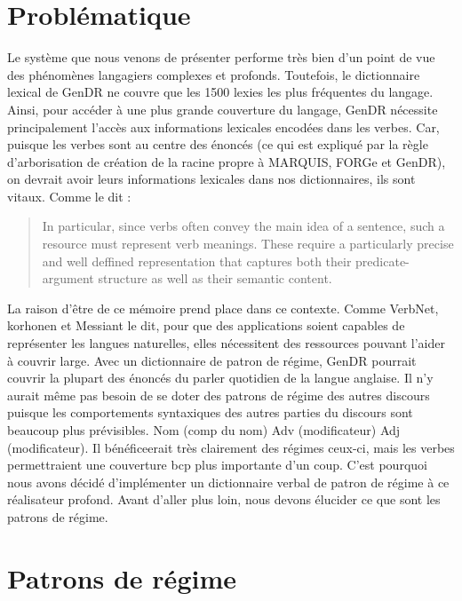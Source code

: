 
\section{Problématique}\label{problema}

Le système que nous venons de présenter performe très bien d'un point de vue des phénomènes langagiers complexes et profonds. Toutefois, le dictionnaire lexical de GenDR ne couvre que les 1500 lexies les plus fréquentes du langage. Ainsi, pour accéder à une plus grande couverture du langage, GenDR nécessite principalement l'accès aux informations lexicales encodées dans les verbes. Car, puisque les verbes sont au centre des énoncés (ce qui est expliqué par la règle d'arborisation de création de la racine propre à MARQUIS, FORGe et GenDR), on devrait avoir leurs informations lexicales dans nos dictionnaires, ils sont vitaux. Comme le dit \cite{SchulerVerbnetBroadcoverageComprehensive2005}:
\begin{quotation} In particular, since verbs often convey the main idea of a sentence, such a resource must represent verb meanings. These require a particularly precise and well deffined representation that captures both their predicate-argument structure as well as their semantic content.\end{quotation}

La raison d'être de ce mémoire prend place dans ce contexte. Comme VerbNet, korhonen et Messiant le dit, pour que des applications soient capables de représenter les langues naturelles, elles nécessitent des ressources pouvant l'aider à couvrir large. Avec un dictionnaire de patron de régime, GenDR pourrait couvrir la plupart des énoncés du parler quotidien de la langue anglaise. Il n'y aurait même pas besoin de se doter des patrons de régime des autres discours puisque les comportements syntaxiques des autres parties du discours sont beaucoup plus prévisibles. Nom (comp du nom) Adv (modificateur) Adj (modificateur). Il bénéficeerait très clairement des régimes ceux-ci, mais les verbes permettraient une couverture bcp plus importante d'un coup. C'est pourquoi nous avons décidé d'implémenter un dictionnaire verbal de patron de régime à ce réalisateur profond. Avant d'aller plus loin, nous devons élucider ce que sont les patrons de régime.

\section{Patrons de régime}

